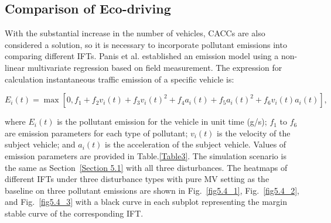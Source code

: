 \documentclass[journal]{IEEEtran}
\begin{document}


\subsection{Comparison of Eco-driving}
\label{Section 5.5}
With the substantial increase in the number of vehicles, CACCs are also considered a solution, so it is necessary to incorporate pollutant emissions into comparing different IFTs. Panis et al. \citep{panis2006modelling} established an emission model using a non-linear multivariate regression based on field measurement. The expression for calculation instantaneous traffic emission of a specific vehicle is:
\begin{small}
  \begin{equation}
    E_{i}(t)=\max \left[0, f_{1}\!+\!f_{2} v_{i}(t)\!+\!f_{3} v_{i}(t)^{2}\!+\!f_{4} a_{i}(t)\!+\!f_{5} a_{i}(t)^{2}\!+\!f_{6} v_{i}(t) a_{i}(t)\right],
  \end{equation}
\end{small}
where $E_i (t)$ is the pollutant emission for the vehicle in unit time (g/s); $f_1$ to $f_6$ are emission parameters for each type of pollutant; $v_i (t)$ is the velocity of the subject vehicle; and $a_i (t)$ is the acceleration of the subject vehicle. Values of emission parameters are provided in Table.\ref{Table3}. The simulation scenario is the same as Section~\ref{Section 5.1} with all three disturbances. The heatmaps of different IFTs under three disturbance types with pure MV setting as the baseline on three pollutant emissions are shown in Fig.~\ref{fig5.4_1}, Fig.~\ref{fig5.4_2}, and Fig.~\ref{fig5.4_3} with a black curve in each subplot representing the margin stable curve of the corresponding IFT.
\end{document}
